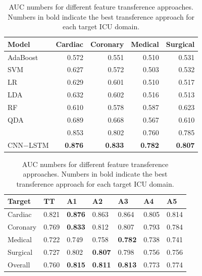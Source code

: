 \setlength{\tabcolsep}{3.5pt}
\renewcommand{\arraystretch}{1.1}
\begin{table}[htb]
\caption{AUC numbers for shallow and deep models. Numbers in bold indicate the best models for each ICU domain.}
\label{tab:res1}
\begin{center}
\begin{tabular}{lrrrr}
\hline
Model   & Cardiac & Coronary & Medical & Surgical\\ \hline
AdaBoost    & 0.572 & 0.551 & 0.510 & 0.531\\
SVM         & 0.627 & 0.572 & 0.503 & 0.532\\
LR          & 0.629 & 0.601 & 0.510 & 0.517\\
LDA         & 0.632 & 0.602 & 0.516 & 0.513\\
RF          & 0.610 & 0.578 & 0.587 & 0.623\\
QDA         & 0.689 & 0.668 & 0.567 & 0.610\\
\citep{kdd} & 0.853 & 0.802 & 0.760 & 0.785\\
CNN$-$LSTM  & \textbf{0.876} & \textbf{0.833} & \textbf{0.782} & \textbf{0.807}\\
\hline
\end{tabular}
\end{center}

\setlength{\tabcolsep}{4.4pt}   
\renewcommand{\arraystretch}{1.1}
\caption{AUC numbers for different feature transference approaches. Numbers in bold indicate the best transference approach for each target ICU domain.}
\label{tab:res2}
\begin{center}
\begin{tabular}{lllllll}
\hline
Target   & TT    & A1    & A2    & A3    & A4    & A5   \\\hline
Cardiac   & 0.821 & \textbf{0.876} & 0.863 & 0.864  & 0.805 & 0.814\\
Coronary  & 0.769 & \textbf{0.833} & 0.812 & 0.807  & 0.793 & 0.784\\
Medical   & 0.722 & 0.749          & 0.758  & \textbf{0.782} & 0.738 & 0.741\\
Surgical  & 0.727 & 0.802          & \textbf{0.807} & 0.798  & 0.756 & 0.756\\\cline{2-7}
Overall	  & 0.760 & \textbf{0.815}          & \textbf{0.811} & \textbf{0.813}  & 0.773   & 0.774\\\cline{2-7}
\hline
\end{tabular}
\end{center}
\end{table}
\setlength{\tabcolsep}{6.0pt}
\renewcommand{\arraystretch}{1}

